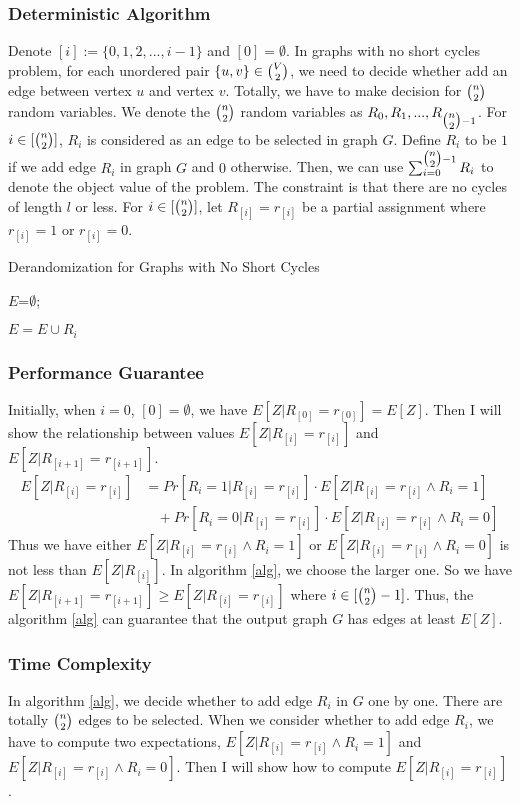 \subsubsection{Deterministic Algorithm}
Denote $[i]:=\{0,1,2,...,i-1\}$ and $[0]=\emptyset$.
In graphs with no short cycles problem, for each unordered pair $\{u, v\} \in \tbinom{V}{2}$, we need to decide whether add an edge between vertex $u$ and vertex $v$. 
Totally, we have to make decision for $\tbinom{n}{2}$ random variables.
We denote the $\tbinom{n}{2}$ random variables as $R_0, R_1, ..., R_{\tbinom{n}{2}-1}$. %
For $i\in [\tbinom{n}{2}]$, $R_i$ is considered as an edge to be selected in graph $G$.
Define $R_i$ to be $1$ if we add edge $R_i$ in graph $G$ and $0$ otherwise. 
Then, we can use $\sum_{i=0}^{\tbinom{n}{2}-1}R_i$ to denote the object value of the problem. The constraint is that there are no cycles of length $l$ or less.
For $i\in [\tbinom{n}{2}]$, let $R_{[i]}=r_{[i]}$ be a partial assignment where $r_{[i]}=1$ or $r_{[i]}=0$.
\begin{algorithm}
    \caption{Derandomization for Graphs with No Short Cycles}\label{alg}
    {
        $E$=$\emptyset$;

        {
            {
               $ E=E\cup R_i$
            }
        
        }
    }
\end{algorithm}
\subsubsection{Performance Guarantee}

Initially, when $i=0$, $[0]=\emptyset$, we have $E[Z|R_{[0]}=r_{[0]}]=E[Z]$.
Then I will show the relationship between values $E[Z|R_{[i]}=r_{[i]}]$ and  $E[Z|R_{[i+1]}=r_{[i+1]}]$. 
\begin{align}
    \nonumber E[Z|R_{[i]}=r_{[i]}]&=Pr[R_i=1|R_{[i]}=r_{[i]}]\cdot E[Z|R_{[i]}=r_{[i]}\wedge R_i=1]\\
    \nonumber &~~~~+Pr[R_i=0|R_{[i]}=r_{[i]}]\cdot E[Z|R_{[i]}=r_{[i]}\wedge R_i=0]
\end{align}
Thus we have either $E[Z|R_{[i]}=r_{[i]}\wedge R_i=1]$ or $E[Z|R_{[i]}=r_{[i]}\wedge R_i=0]$ is not less than  $E[Z|R_{[i]}] $. In algorithm \ref{alg}, we choose the larger one. So we have $E[Z|R_{[i+1]}=r_{[i+1]}] \ge E[Z|R_{[i]}=r_{[i]}]$ where $i\in [\tbinom{n}{2}-1]$.
Thus, the algorithm \ref{alg} can guarantee that the output graph $G$ has edges at least $E[Z]$.
\subsubsection{Time Complexity }
In algorithm \ref{alg}, we decide whether to add edge $R_i$ in $G$ one by one. There are totally $\tbinom{n}{2}$ edges to be selected.
When we consider whether to add edge $R_i$, we have to compute two expectations, $E[Z|R_{[i]}=r_{[i]}\wedge R_i=1]$ and $E[Z|R_{[i]}=r_{[i]}\wedge R_i=0]$. Then I will show how to compute $E[Z|R_{[i]}=r_{[i]}]$.